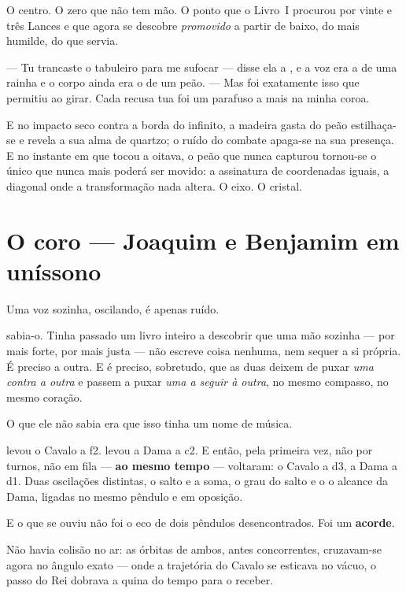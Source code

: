 \documentclass[livro.tex]{subfiles}
\begin{document}
O centro. O zero que não tem mão. O ponto que o Livro~I procurou por vinte e três
Lances e que agora se descobre \emph{promovido} a partir de baixo, do mais humilde,
do que servia.

\medskip

--- Tu trancaste o tabuleiro para me sufocar --- disse ela a \Ven , e a voz era a de
uma rainha e o corpo ainda era o de um peão. --- Mas foi exatamente isso que
permitiu ao \Lck girar. Cada recusa tua foi um parafuso a mais na minha coroa.

E no impacto seco contra a borda do infinito, a madeira gasta do peão estilhaça-se e
revela a sua alma de quartzo; o ruído do combate apaga-se na sua presença. E no instante
em que tocou a oitava, o peão que nunca capturou tornou-se o único
que nunca mais poderá ser movido: a assinatura de coordenadas iguais, a
diagonal onde a transformação nada altera. O eixo. O cristal.

\chapter{O coro --- Joaquim e Benjamim em uníssono}

Uma voz sozinha, oscilando, é apenas ruído.

\Ben sabia-o. Tinha passado um livro inteiro a descobrir que uma mão sozinha
--- por mais forte, por mais justa --- não escreve coisa nenhuma, nem sequer a si
própria. É preciso a outra. E é preciso, sobretudo, que as duas deixem de puxar
\emph{uma contra a outra} e passem a puxar \emph{uma a seguir à outra}, no mesmo
compasso, no mesmo coração.

O que ele não sabia era que isso tinha um nome de música.

\medskip

\Joa levou o Cavalo a \textsf{f2}. \Ben levou a Dama a \textsf{c2}. E então, pela primeira
vez, não por turnos, não em fila --- \textbf{ao mesmo tempo} --- voltaram: o Cavalo a
\textsf{d3}, a Dama a \textsf{d1}. Duas oscilações distintas, o salto e a soma, o grau do salto e o
o alcance da Dama, ligadas no mesmo pêndulo e em oposição.

E o que se ouviu não foi o eco de dois pêndulos desencontrados. Foi um
\textbf{acorde}.

\medskip

Não havia colisão no ar: as órbitas de ambos, antes concorrentes, cruzavam-se agora no
ângulo exato --- onde a trajetória do Cavalo se esticava no vácuo, o passo do Rei dobrava
a quina do tempo para o receber.
\end{document}
